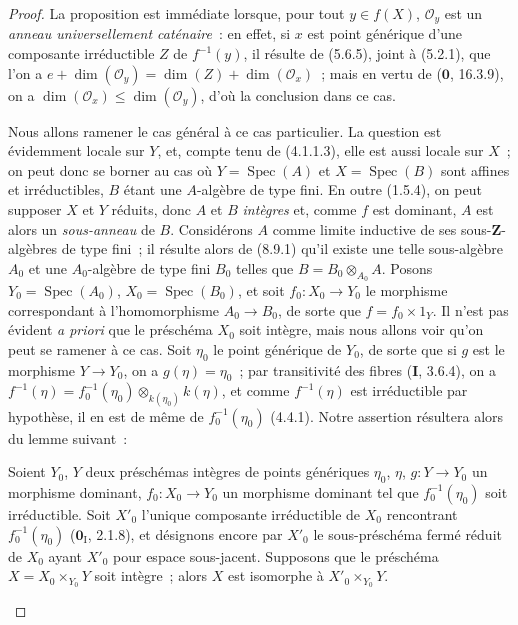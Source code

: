 \begin{proof}
La proposition est immédiate lorsque, pour tout $y\in f(X)$,
$\mathcal O_y$ est un \emph{anneau universellement caténaire}~: en effet, si
$x$ est point générique d'une composante irréductible $Z$ de $f^{-1}(y)$, il
résulte de (5.6.5), joint à (5.2.1), que l'on a
$e+\dim(\mathcal O_y)=\dim(Z)+\dim(\mathcal O_x)$~; mais en vertu de
($\mathbf 0$, 16.3.9), on a $\dim(\mathcal O_x)\leq\dim(\mathcal O_y)$,
d'où la conclusion dans ce cas.

Nous allons ramener le cas général à ce cas particulier. La question est
évidemment locale sur $Y$, et, compte tenu de (4.1.1.3), elle est aussi locale
sur $X$~; on peut donc se borner au cas où $Y=\operatorname{Spec}(A)$ et
$X=\operatorname{Spec}(B)$ sont affines et irréductibles, $B$ étant une
$A$-algèbre de type fini. En outre (1.5.4), on peut supposer $X$ et $Y$
réduits, donc $A$ et $B$ \emph{intègres} et, comme $f$ est dominant, $A$ est
alors un \emph{sous-anneau} de $B$. Considérons $A$ comme limite inductive de
ses sous-$\mathbf Z$-algèbres de type fini~; il résulte alors de (8.9.1) qu'il
existe une telle sous-algèbre $A_0$ et une $A_0$-algèbre de type fini $B_0$
telles que $B=B_0\otimes_{A_0}A$. Posons $Y_0=\operatorname{Spec}(A_0)$,
$X_0=\operatorname{Spec}(B_0)$, et soit $f_0:X_0\to Y_0$ le morphisme
correspondant à l'homomorphisme $A_0\to B_0$, de sorte que
$f=f_0\times 1_Y$. Il n'est pas évident \emph{a priori} que le préschéma $X_0$
soit intègre, mais nous allons voir qu'on peut se ramener à ce cas. Soit
$\eta_0$ le point générique de $Y_0$, de sorte que si $g$ est le morphisme
$Y\to Y_0$, on a $g(\eta)=\eta_0$~; par transitivité des fibres
(\textbf{I}, 3.6.4), on a
$f^{-1}(\eta)=f_0^{-1}(\eta_0)\otimes_{k(\eta_0)}k(\eta)$, et comme
$f^{-1}(\eta)$ est irréductible par hypothèse, il en est de même de
$f_0^{-1}(\eta_0)$ (4.4.1). Notre assertion résultera alors du lemme suivant~:

\begin{lemma}[13.1.2]
\label{IV.13.1.2-fr}
Soient $Y_0$, $Y$ deux préschémas intègres de points génériques $\eta_0$,
$\eta$, $g:Y\to Y_0$ un morphisme dominant, $f_0:X_0\to Y_0$ un morphisme
dominant tel que $f_0^{-1}(\eta_0)$ soit irréductible. Soit $X'_0$ l'unique
composante irréductible de $X_0$ rencontrant $f_0^{-1}(\eta_0)$
($\mathbf 0_{\mathrm I}$, 2.1.8), et désignons encore par $X'_0$ le
sous-préschéma fermé réduit de $X_0$ ayant $X'_0$ pour espace sous-jacent.
Supposons que le préschéma $X=X_0\times_{Y_0}Y$ soit intègre~; alors $X$ est
isomorphe à $X'_0\times_{Y_0}Y$.
\end{lemma}


\end{proof}
